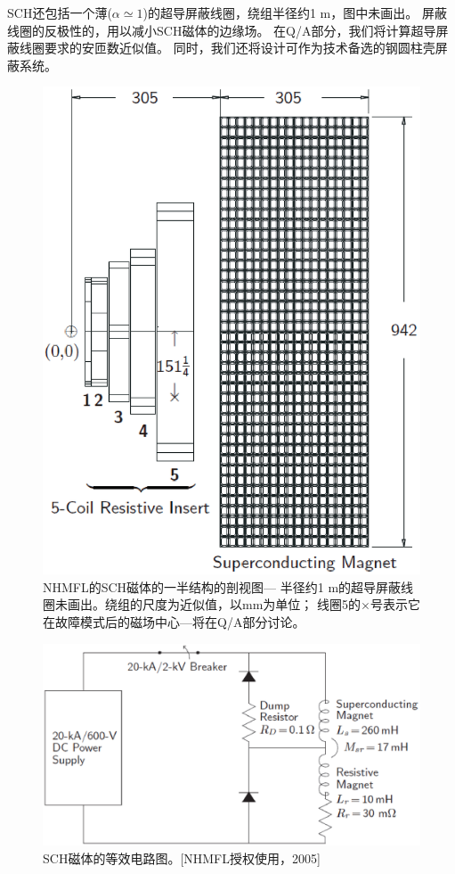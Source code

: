SCH还包括一个薄($\alpha\simeq 1$)的超导屏蔽线圈，绕组半径约1 m，图中未画出。
屏蔽线圈的反极性的，用以减小SCH磁体的边缘场。
在Q/A部分，我们将计算超导屏蔽线圈要求的安匝数近似值。
同时，我们还将设计可作为技术备选的钢圆柱壳屏蔽系统。
\begin{figure}[htbp]
	\centering
	\includegraphics[scale=0.6]{chpt9/figs/fig9.1.eps}
	\caption{NHMFL的SCH磁体的一半结构的剖视图---
		半径约1 m的超导屏蔽线圈未画出。绕组的尺度为近似值，以mm为单位；
	线圈5的$\times$号表示它在故障模式后的磁场中心---将在Q/A部分讨论。}
\end{figure}

\begin{figure}[htbp]
	\centering
	\includegraphics[scale=0.6]{chpt9/figs/fig9.2.eps}
	\caption{SCH磁体的等效电路图。[NHMFL授权使用，2005]}
\end{figure}

